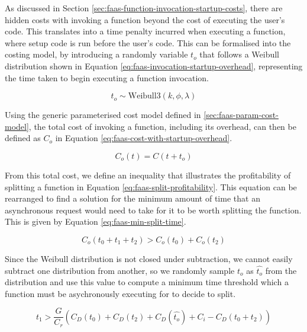 As discussed in Section \ref{sec:faas-function-invocation-startup-costs}, there are hidden costs with invoking a function beyond the cost of executing the user's code. This translates into a time penalty incurred when executing a function, where setup code is run before the user's code. This can be formalised into the costing model, by introducing a randomly variable $t_o$ that follows a Weibull distribution shown in Equation \ref{eq:faas-invocation-startup-overhead}, representing the time taken to begin executing a function invocation.

\begin{equation}
\label{eq:faas-invocation-startup-overhead}
t_o \sim \text{Weibull3}(k, \phi, \lambda)
\end{equation}

Using the generic parameterised cost model defined in \ref{sec:faas-param-cost-model}, the total cost of invoking a function, including its overhead, can then be defined as $C_o$ in Equation \ref{eq:faas-cost-with-startup-overhead}.

\begin{equation}
\label{eq:faas-cost-with-startup-overhead}
C_o(t) = C(t + t_o)
\end{equation}

From this total cost, we define an inequality that illustrates the profitability of splitting a function in Equation \ref{eq:faas-split-profitability}. This equation can be rearranged to find a solution for the minimum amount of time that an asynchronous request would need to take for it to be worth splitting the function. This is given by Equation \ref{eq:faas-min-split-time}.

\begin{equation} \label{eq:faas-split-profitability}
C_o(t_0 + t_1 + t_2) > C_o(t_0) + C_o(t_2)
\end{equation}

Since the Weibull distribution is not closed under subtraction, we cannot easily subtract one distribution from another, so we randomly sample $t_o$ as $\hat{t_o}$ from the distribution and use this value to compute a minimum time threshold which a function must be asychronously executing for to decide to split.

\begin{equation} \label{eq:faas-min-split-time}
t_1 > \frac{G}{C_r} \left( C_D(t_0) + C_D(t_2) + C_D(\hat{t_o}) + C_i - C_D(t_0 + t_2) \right)
\end{equation}

